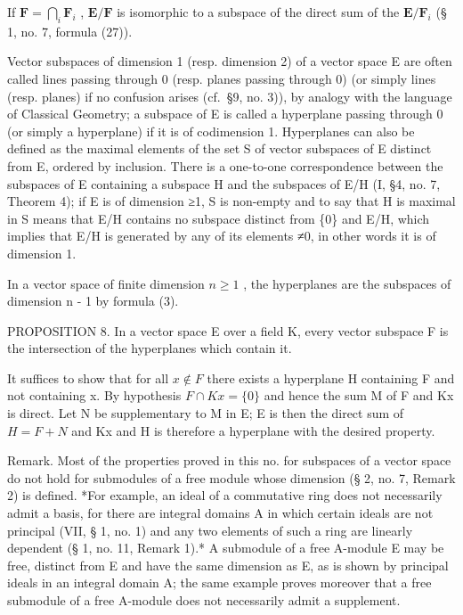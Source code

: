 If \(\mathbf{F} = \bigcap_{i}\mathbf{F}_{i}\) , \(\mathbf{E} / \mathbf{F}\) is isomorphic to a subspace of the direct sum of the \(\mathbf{E} / \mathbf{F}_i\) (§ 1, no. 7, formula (27)).

Vector subspaces of dimension 1 (resp. dimension 2) of a vector space E are often called lines passing through 0 (resp. planes passing through 0) (or simply lines (resp. planes) if no confusion arises (cf.~§9, no. 3)), by analogy with the language of Classical Geometry; a subspace of E is called a hyperplane passing through 0 (or simply a hyperplane) if it is of codimension 1. Hyperplanes can also be defined as the maximal elements of the set S of vector subspaces of E distinct from E, ordered by inclusion. There is a one-to-one correspondence between the subspaces of E containing a subspace H and the subspaces of E/H (I, §4, no. 7, Theorem 4); if E is of dimension ≥1, S is non-empty and to say that H is maximal in S means that E/H contains no subspace distinct from \{0\} and E/H, which implies that E/H is generated by any of its elements ≠0, in other words it is of dimension 1.

In a vector space of finite dimension \(n \geqslant 1\) , the hyperplanes are the subspaces of dimension n - 1 by formula (3).

PROPOSITION 8. In a vector space E over a field K, every vector subspace F is the intersection of the hyperplanes which contain it.

It suffices to show that for all \(x \notin F\) there exists a hyperplane H containing F and not containing x. By hypothesis \(F \cap Kx = \{0\}\) and hence the sum M of F and Kx is direct. Let N be supplementary to M in E; E is then the direct sum of \(H = F + N\) and Kx and H is therefore a hyperplane with the desired property.

Remark. Most of the properties proved in this no. for subspaces of a vector space do not hold for submodules of a free module whose dimension (§ 2, no. 7, Remark 2) is defined. *For example, an ideal of a commutative ring does not necessarily admit a basis, for there are integral domains A in which certain ideals are not principal (VII, § 1, no. 1) and any two elements of such a ring are linearly dependent (§ 1, no. 11, Remark 1).* A submodule of a free A-module E may be free, distinct from E and have the same dimension as E, as is shown by principal ideals in an integral domain A; the same example proves moreover that a free submodule of a free A-module does not necessarily admit a supplement.

